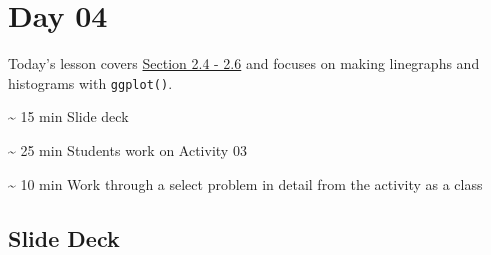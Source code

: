 \documentclass[
  letterpaper,
  DIV=11,
  numbers=noendperiod]{scrreprt}
\begin{document}

\hypertarget{day-04}{%
\chapter*{Day 04}\label{day-04}}

Today's lesson covers
\href{https://nustat.github.io/intro-stat-data-sci/02-visualization.html}{Section
2.4 - 2.6} and focuses on making linegraphs and histograms with
\texttt{ggplot()}.

\begin{tcolorbox}[enhanced jigsaw, colframe=quarto-callout-note-color-frame, breakable, colback=white, toprule=.15mm, leftrule=.75mm, title={Agenda}, left=2mm, coltitle=black, bottomtitle=1mm, bottomrule=.15mm, rightrule=.15mm, colbacktitle=quarto-callout-note-color!10!white, opacitybacktitle=0.6, opacityback=0, toptitle=1mm, arc=.35mm, titlerule=0mm]
\textasciitilde{} 15 min Slide deck

\textasciitilde{} 25 min Students work on Activity 03

\textasciitilde{} 10 min Work through a select problem in detail from
the activity as a class
\end{tcolorbox}

\hypertarget{slide-deck-3}{%
\section*{Slide Deck}\label{slide-deck-3}}
\end{document}
